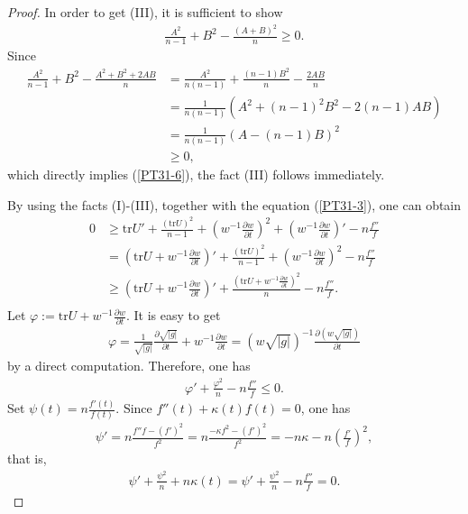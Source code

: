 \documentclass[12pt]{article}
\begin{document}
\begin{proof}
In order to get (III),  it is sufficient to show
 \begin{eqnarray} \label{PT31-6}
\frac{A^{2}}{n-1}+B^{2}-\frac{(A+B)^{2}}{n}\geq 0.
\end{eqnarray}
Since
\begin{equation*}
\begin{aligned}
\frac{A^{2}}{n-1}+B^{2}-\frac{A^{2}+B^{2}+2AB}{n}
&= \frac{A^{2}}{n(n-1)}+\frac{(n-1)B^{2}}{n}-\frac{2AB}{n}  \\
&=\frac{1}{n(n-1)}(A^{2}+(n-1)^{2}B^{2}-2(n-1)AB)  \\
&=\frac{1}{n(n-1)}(A-(n-1)B)^{2}  \\
&\geq 0,
\end{aligned}
\end{equation*}
which directly implies (\ref{PT31-6}), the fact (III) follows
immediately.

By using the facts (I)-(III), together with the equation
(\ref{PT31-3}), one can obtain
\begin{equation*}
\begin{aligned}
0 &\geq \mathrm{tr} U'+\frac{(\mathrm{tr} U)^{2}}{n-1}+\left(w^{-1}\frac{\partial w}{\partial t}\right)^{2}+\left(w^{-1}\frac{\partial w}{\partial t}\right)'-n\frac{f''}{f} \nonumber\\
&=\left(\mathrm{tr} U+w^{-1}\frac{\partial w}{\partial t}\right)'+\frac{(\mathrm{tr} U)^{2}}{n-1}+\left(w^{-1}\frac{\partial w}{\partial t}\right)^{2}-n\frac{f''}{f} \nonumber \\
&\geq \left(\mathrm{tr} U+w^{-1}\frac{\partial w}{\partial t}\right)'+\frac{(\mathrm{tr} U+w^{-1}\frac{\partial w}{\partial t})^{2}}{n}-n\frac{f''}{f}. \\
\end{aligned}
\end{equation*}
Let $\varphi:=\mathrm{tr} U+w^{-1}\frac{\partial w}{\partial t}$. It
is easy to get
 \begin{eqnarray*}
\varphi=\frac{1}{\sqrt{|g|}}\frac{\partial \sqrt{|g|}}{\partial
t}+w^{-1}\frac{\partial w}{\partial
t}=(w\sqrt{|g|})^{-1}\frac{\partial (w\sqrt{|g|})}{\partial t}
 \end{eqnarray*}
by a direct computation. Therefore, one has
 \begin{eqnarray} \label{PT31-7}
\varphi'+\frac{\varphi^{2}}{n}-n\frac{f''}{f}\leq 0.
 \end{eqnarray}
Set $\psi (t)=n\frac{f'(t)}{f(t)}$. Since $f''(t)+\kappa(t)f(t)=0$,
one has
 \begin{eqnarray*}
\psi'=n\frac{f''f-(f')^{2}}{f^{2}}=n\frac{-\kappa
f^{2}-(f')^{2}}{f^{2}}=-n\kappa-n\left(\frac{f'}{f}\right)^{2},
 \end{eqnarray*}
that is,
 \begin{eqnarray}  \label{PT31-8}
\psi'+\frac{\psi^{2}}{n}+n\kappa(t)=\psi'+\frac{\psi^{2}}{n}-n\frac{f''}{f}=0.
 \end{eqnarray}


\end{proof}
\end{document}
